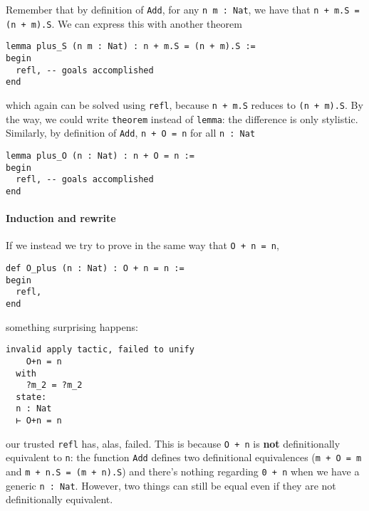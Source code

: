 \documentclass{book}
\theoremstyle{definition}
\theoremstyle{remark}
\theoremstyle{plain}
\begin{document}
Remember that by definition of \lstinline{Add}, for any \lstinline{n m : Nat},
we have that \lstinline{n + m.S = (n + m).S}.
We can express this with another theorem
\begin{lstlisting}
lemma plus_S (n m : Nat) : n + m.S = (n + m).S :=
begin
  refl, -- goals accomplished
end
\end{lstlisting}
which again can be solved using \lstinline{refl}, because \lstinline{n + m.S} reduces to \lstinline{(n + m).S}.
By the way, we could write \lstinline{theorem} instead of \lstinline{lemma}: the difference is only stylistic.
Similarly, by definition of \lstinline{Add}, \lstinline{n + O = n} for all \lstinline{n : Nat}
\begin{lstlisting}
lemma plus_O (n : Nat) : n + O = n :=
begin
  refl, -- goals accomplished
end
\end{lstlisting}

\paragraph{Induction and rewrite}

If we instead we try to prove in the same way that \lstinline{O + n = n},
\begin{lstlisting}
def O_plus (n : Nat) : O + n = n :=
begin
  refl,
end
\end{lstlisting}
something surprising happens:
\begin{lstlisting}
invalid apply tactic, failed to unify
    O+n = n
  with
    ?m_2 = ?m_2
  state:
  n : Nat
  ⊢ O+n = n
\end{lstlisting}
our trusted \lstinline{refl} has, alas, failed.
This is because \lstinline{O + n} is \textbf{not} definitionally equivalent to \lstinline{n}:
the function \lstinline{Add} defines two definitional equivalences
(\lstinline{m + O = m} and \lstinline{m + n.S = (m + n).S})
and there's nothing regarding \lstinline{0 + n} when we have a generic \lstinline{n : Nat}.
However, two things can still be equal even if they are not definitionally equivalent.
\end{document}
